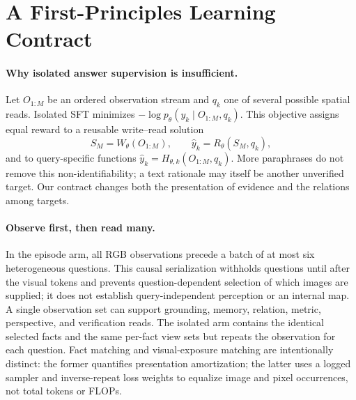 \section{A First-Principles Learning Contract}
\label{sec:principles}

\paragraph{Why isolated answer supervision is insufficient.}
Let $O_{1:M}$ be an ordered observation stream and $q_k$ one of several
possible spatial reads.  Isolated SFT minimizes
$-\log p_\theta(y_k\mid O_{1:M},q_k)$.  This objective assigns equal reward to
a reusable write--read solution
\begin{equation}
  S_M=W_\theta(O_{1:M}), \qquad
  \hat y_k=R_\theta(S_M,q_k),
  \label{eq:write-read}
\end{equation}
and to query-specific functions
$\hat y_k=H_{\theta,k}(O_{1:M},q_k)$.  More paraphrases do not remove this
non-identifiability; a text rationale may itself be another unverified target.
Our contract changes both the presentation of evidence and the relations among
targets.

\paragraph{Observe first, then read many.}
In the episode arm, all RGB observations precede a batch of at most six
heterogeneous questions.  This causal serialization withholds questions until
after the visual tokens and prevents question-dependent selection of which
images are supplied; it does not establish query-independent perception or an
internal map.  A single observation set can support grounding, memory,
relation, metric, perspective, and verification reads.  The isolated arm
contains the identical selected facts and the same per-fact view sets but
repeats the observation for each question.  Fact matching and visual-exposure
matching are intentionally distinct: the former quantifies presentation
amortization; the latter uses a logged sampler and inverse-repeat loss weights
to equalize image and pixel occurrences, not total tokens or FLOPs.

